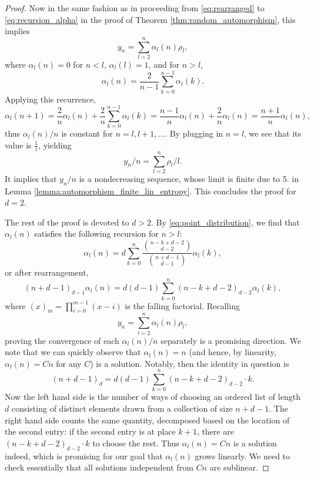 \documentclass[10pt,a4paper]{amsart}
\begin{document}
\begin{proof}
    Now in the same fashion as in proceeding from \eqref{eq:rearranged} to \eqref{eq:recursion_alpha} in the proof of Theorem \ref{thm:random_automorphism}, this implies
    $$y_n = \sum_{l=2}^{n}\alpha_l(n)\rho_l,$$
    where $\alpha_l(n)=0$ for $n<l$, $\alpha_l(l)=1$, and for $n>l$,
    $$\alpha_l(n)=\frac{2}{n-1}\sum_{k=0}^{n-1}\alpha_l(k).$$
    Applying this recurrence,
    $$\alpha_l(n+1)= \frac{2}{n}\alpha_l(n)+\frac{2}{n}\sum_{k=0}^{n-1}\alpha_l(k)=\frac{n-1}{n}\alpha_l(n)+\frac{2}{n}\alpha_l(n)=\frac{n+1}{n}\alpha_l(n),$$
    thus $\alpha_l(n)/n$ is constant for $n=l, l+1, \dots$. By plugging in $n=l$, we see that its value is $\frac{1}{l}$, yielding
    $$y_n/n = \sum_{l=2}^{n}\rho_l/l.$$
    It implies that $y_n/n$ is a nondecreasing sequence, whose limit is finite due to 5. in Lemma \ref{lemma:automorphism_finite_lin_entropy}. This concludes the proof for $d=2$.

    The rest of the proof is devoted to $d>2$. By \eqref{eq:point_distribution}, we find that $\alpha_l(n)$ satisfies the following recursion for $n>l$:
    \begin{equation}\label{eq:recursion_alpha_d>2}
    \alpha_l(n)= d\sum_{k=0}^{n}\frac{\binom{n-k+d-2}{d-2}}{\binom{n+d-1}{d-1}}\alpha_l(k),
    \end{equation}
    or after rearrangement,
    \begin{equation}\label{eq:recursion2_alpha_d>2}
    (n+d-1)_{d-1}\alpha_l(n)= d(d-1)\sum_{k=0}^{n}(n-k+d-2)_{d-2}\alpha_l(k),
    \end{equation}    
    where $(x)_m=\prod_{i=0}^{m-1}(x-i)$ is the falling factorial. Recalling
    $$y_n = \sum_{l=2}^{n}\alpha_l(n)\rho_l,$$
    proving the convergence of each $\alpha_l(n)/n$ separately is a promising direction. We note that we can quickly observe that $\alpha_l(n)=n$ (and hence, by linearity, $\alpha_l(n)=Cn$ for any $C$) is a solution. Notably, then the identity in question is
    $$(n+d-1)_{d}= d(d-1)\sum_{k=0}^{n}(n-k+d-2)_{d-2}\cdot k.$$     
    Now the left hand side is the number of ways of choosing an ordered list of length $d$ consisting of distinct elements drawn from a collection of size $n+d-1$. The right hand side counts the same quantity, decomposed based on the location of the second entry: if the second entry is at place $k+1$, there are $(n-k+d-2)_{d-2}\cdot k$ to choose the rest. Thus $\alpha_l(n)=Cn$ is a solution indeed, which is promising for our goal that $\alpha_l(n)$ grows linearly. We need to check essentially that all solutions independent from $Cn$ are sublinear.


\end{proof}
\end{document}
